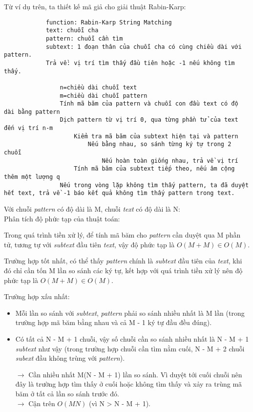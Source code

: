 \documentclass[a4paper,11pt]{article}
\begin{document}
\begin{enumerate}
Từ ví dụ trên, ta thiết kế mã giả cho giải thuật Rabin-Karp:

			\begin{lstlisting}
			function: Rabin-Karp String Matching
			text: chuỗi cha 
			pattern: chuỗi cần tìm 
			subtext: 1 đoạn thân của chuỗi cha có cùng chiều dài với pattern.
			Trả về: vị trí tìm thấy đầu tiên hoặc -1 nếu không tìm thấy.
			
				n=chiều dài chuỗi text
				m=chiều dài chuỗi pattern
				Tính mã băm của pattern và chuỗi con đầu text có độ dài bằng pattern
				Dịch pattern từ vị trí 0, qua từng phần tử của text đến vị trí n-m
					Kiểm tra mã băm của subtext hiện tại và pattern
						Nếu bằng nhau, so sánh từng ký tự trong 2 chuỗi
							Nếu hoàn toàn giống nhau, trả về vị trí
					Tính mã băm của subtext tiếp theo, nếu âm cộng thêm một lượng q
				Nếu trong vòng lặp không tìm thấy pattern, ta đã duyệt hết text, trả về -1 báo kết quả không tìm thấy pattern trong text.
			\end{lstlisting}

			Với chuỗi \textit{pattern} có độ dài là M, chuỗi \textit{text} có độ dài là N: \\
			Phân tích độ phức tạp của thuật toán:

				Trong quá trình tiền xử lý, để tính mã băm cho \textit{pattern} cần duyệt qua M phần tử, tương tự với \textit{subtext} đầu tiên \textit{text}, vậy độ phức tạp là $O(M+M) \in O(M)$.

				Trường hợp tốt nhất, có thể thấy \textit{pattern} chính là \textit{subtext} đầu tiên của \textit{text}, khi đó chỉ cần tốn M lần so sánh các ký tự, kết hợp với quá trình tiền xử lý nên độ phức tạp là $O(M+M) \in O(M)$.

				Trường hợp xấu nhất:
			\begin{itemize}
				\item Mỗi lần so sánh với \textit{subtext}, \textit{pattern} phải so sánh nhiều nhất là M lần (trong trường hợp mã băm bằng nhau và cả M - 1 ký tự đầu đều đúng).
				\item Có tất cả N - M + 1 chuỗi, vậy số chuỗi cần so sánh nhiều nhất là N - M + 1 \textit{subtext} như vậy (trong trường hợp chuỗi cần tìm nằm cuối, N - M + 2 chuỗi \textit{subext} đầu không trùng với \textit{pattern}).
				
				$\to$ Cần nhiều nhất M(N - M + 1) lần so sánh. Vì duyệt tới cuối chuỗi nên đây là trường hợp tìm thấy ở cuối hoặc không tìm thấy và xảy ra trùng mã băm ở tất cả lần so sánh trước đó.\\
				$\to$ Cận trên $O(MN)$ (vì N > N - M + 1). \\
				

\end{itemize}
\end{enumerate}
\end{document}
